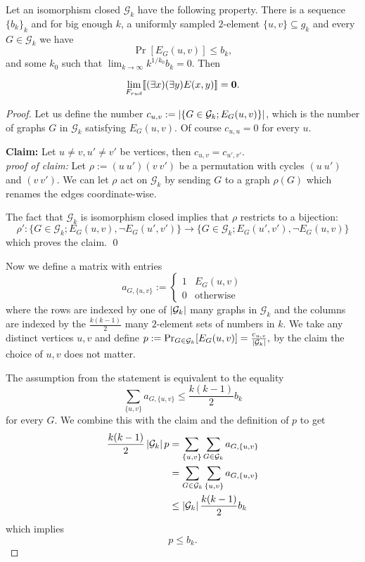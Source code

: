 \begin{thrm}\label{thrmsparse}
Let an isomorphism closed $\mathcal{G}_k$ have the following property. There is a sequence $\{b_k\}_{k}$ and for big enough $k$, a uniformly sampled $2$-element $\{u,v\}\subseteq g_k$ and every $G\in\mathcal{G}_k$ we have
\[\Pr[E_G(u,v)]\leq b_k,\]
and some $k_0$ such that $\lim_{k\to\infty}k^{1/k_0}b_k = 0.$ Then

\[\lim_{F_{rud}}[\![(\exists x)(\exists y)E(x,y)]\!]=\textbf{0}.\]
\end{thrm}
\begin{proof}
Let us define the number $c_{u,v}:=\left|{\{G\in\mathcal{G}_k; E_G(u,v)\}}\right|$, which is the number of graphs $G$ in $\mathcal{G}_k$ satisfying $E_G(u,v)$. Of course $c_{u,u}=0$ for every $u$.

\vspace{0.5em}
\textbf{Claim:} Let $u\neq v,u'\neq v'$ be vertices, then $c_{u,v}=c_{u',v'}$.\\
\textit{proof of claim:} Let $\rho:=(u\:u')(v\:v')$ be a permutation with cycles $(u\:u')$ and $(v\:v')$. We can let $\rho$ act on $\mathcal{G}_k$ by sending $G$ to a graph $\rho(G)$ which renames the edges coordinate-wise.

The fact that $\mathcal{G}_k$ is isomorphism closed implies that $\rho$ restricts to a bijection:
\[\rho':\{G\in\mathcal{G}_k;E_G(u,v), \lnot E_G(u',v')\}\to \{G\in\mathcal{G}_k;E_G(u',v'),\lnot E_G(u,v)\}\]
which proves the claim. \qed
\vspace{0.5em}

Now we define a matrix with entries
\[a_{G,\{u,v\}}:=\begin{cases}1&E_G(u,v)\\0&\text{otherwise}\end{cases}\]
where the rows are indexed by one of $\left|{\mathcal{G}_k}\right|$ many graphs in $\mathcal{G}_k$ and the columns are indexed by the $\frac{k(k-1)}{2}$ many $2$-element sets of numbers in $k$. We take any distinct vertices $u,v$ and define $p:=\Pr_{G\in \mathcal{G}_k}[E_G(u,v)]=\frac{c_{u,v}}{\left|{\mathcal{G}_k}\right|},$ by the claim the choice of $u,v$ does not matter.

The assumption from the statement is equivalent to the equality 
\[\sum_{\{u,v\}}a_{G,\{u,v\}}\leq \frac{k(k-1)}{2}b_k\] 
for every $G$. We combine this with the claim and the definition of $p$ to get
\begin{align}
\frac{k(k-1)}{2}\left|{\mathcal{G}_k}\right|p&=\sum_{\{u,v\}}\sum_{G\in\mathcal{G}_k}a_{G,\{u,v\}}\\
&=\sum_{G\in\mathcal{G}_k}\sum_{\{u,v\}}a_{G,\{u,v\}}\\
&\leq \left|{\mathcal{G}_k}\right|\frac{k(k-1)}{2}b_k
\end{align}
which implies
\[p\leq b_k.\]


\end{proof}
